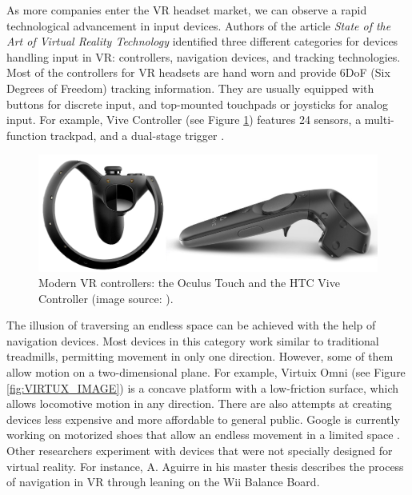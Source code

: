 As more companies enter the VR headset market, we can observe a rapid technological advancement in input devices. Authors of the article \textit{State of the Art of Virtual Reality Technology} \cite{VR_TECHNOLOGY} identified three different categories for devices handling input in VR: controllers, navigation devices, and tracking technologies. Most of the controllers for VR headsets are hand worn and provide 6DoF (Six Degrees of Freedom) tracking information. They are usually equipped with buttons for discrete input, and top-mounted touchpads or joysticks for analog input. For example, Vive Controller (see Figure \ref{fig:CONTROLLERS_IMAGE}) features 24 sensors, a multi-function trackpad, and a dual-stage trigger \cite{VIVE_IMAGE}.

\begin{figure}[th]
\centering
\includegraphics[width=1\textwidth]{img/modern_controllers.png}
\caption{Modern VR controllers: the Oculus Touch and the HTC Vive Controller (image source: \cite{VR_TECHNOLOGY}\cite{VIVE_IMAGE}).}
\label{fig:CONTROLLERS_IMAGE}
\end{figure}

The illusion of traversing an endless space can be achieved with the help of navigation devices. Most devices in this category work similar to traditional treadmills, permitting movement in only one direction. However, some of them allow motion on a two-dimensional plane. For example, Virtuix Omni (see Figure \ref{fig:VIRTUX_IMAGE}) is a concave platform with a low-friction surface, which allows locomotive motion in any direction. There are also attempts at creating devices less expensive and more affordable to general public. Google is currently working on motorized shoes that allow an endless movement in a limited space \cite{VR_SHOES}. Other researchers experiment with devices that were not specially designed for virtual reality. For instance, A. Aguirre in his master thesis \cite{JOYSTICK} describes the process of navigation in VR through leaning on the Wii Balance Board.

